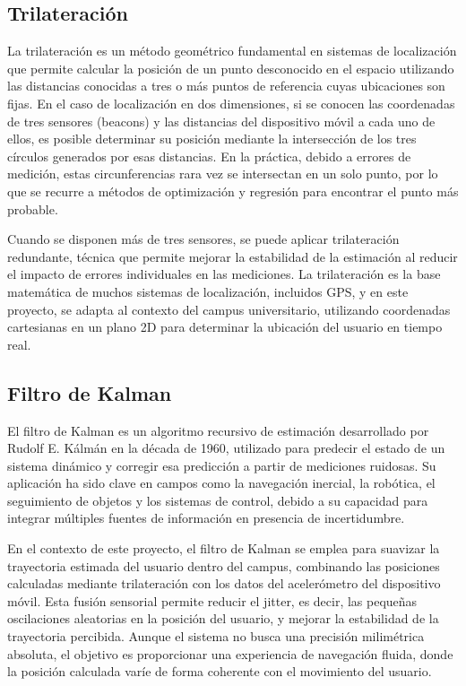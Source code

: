 \documentclass{article}
\begin{document}
\subsection{Trilateración}
{\justify La trilateración es un método geométrico fundamental en sistemas de localización que permite calcular la posición de un punto desconocido en el espacio utilizando las distancias conocidas a tres o más puntos de referencia cuyas ubicaciones son fijas. En el caso de localización en dos dimensiones, si se conocen las coordenadas de tres sensores (beacons) y las distancias del dispositivo móvil a cada uno de ellos, es posible determinar su posición mediante la intersección de los tres círculos generados por esas distancias. En la práctica, debido a errores de medición, estas circunferencias rara vez se intersectan en un solo punto, por lo que se recurre a métodos de optimización y regresión para encontrar el punto más probable.

Cuando se disponen más de tres sensores, se puede aplicar trilateración redundante, técnica que permite mejorar la estabilidad de la estimación al reducir el impacto de errores individuales en las mediciones. La trilateración es la base matemática de muchos sistemas de localización, incluidos GPS, y en este proyecto, se adapta al contexto del campus universitario, utilizando coordenadas cartesianas en un plano 2D para determinar la ubicación del usuario en tiempo real.}

\subsection{ Filtro de Kalman}
{\justify El filtro de Kalman es un algoritmo recursivo de estimación desarrollado por Rudolf E. Kálmán en la década de 1960, utilizado para predecir el estado de un sistema dinámico y corregir esa predicción a partir de mediciones ruidosas. Su aplicación ha sido clave en campos como la navegación inercial, la robótica, el seguimiento de objetos y los sistemas de control, debido a su capacidad para integrar múltiples fuentes de información en presencia de incertidumbre.

En el contexto de este proyecto, el filtro de Kalman se emplea para suavizar la trayectoria estimada del usuario dentro del campus, combinando las posiciones calculadas mediante trilateración con los datos del acelerómetro del dispositivo móvil. Esta fusión sensorial permite reducir el jitter, es decir, las pequeñas oscilaciones aleatorias en la posición del usuario, y mejorar la estabilidad de la trayectoria percibida. Aunque el sistema no busca una precisión milimétrica absoluta, el objetivo es proporcionar una experiencia de navegación fluida, donde la posición calculada varíe de forma coherente con el movimiento del usuario.}
\end{document}

